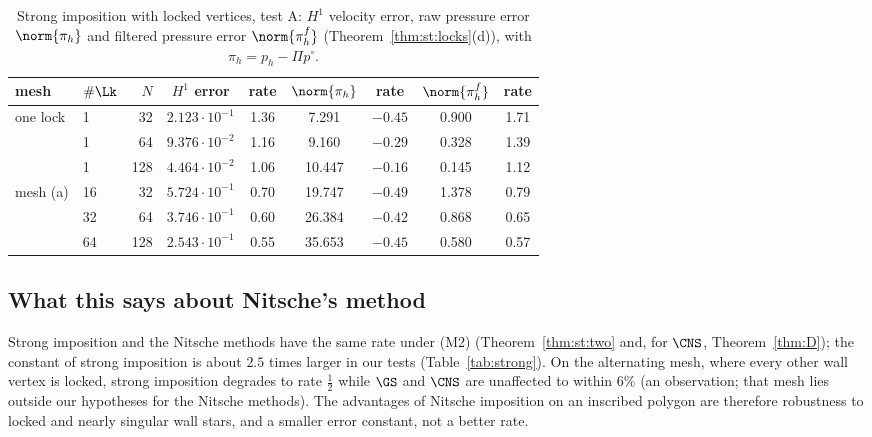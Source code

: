 \begin{table}[t]
\centering\small
\caption{Strong imposition with locked vertices, test A: $H^1$ velocity error, raw pressure error $\norm{\pi_h}$ and filtered pressure error $\norm{\pi_h^f}$ (Theorem~\ref{thm:st:locks}(d)), with $\pi_h=p_h-\Pi p^\circ$.}\label{tab:locks}
\begin{tabular}{llrcccccc}
\toprule
mesh & $\#\Lk$ & $N$ & $H^1$ error & rate & $\norm{\pi_h}$ & rate & $\norm{\pi_h^f}$ & rate\\
\midrule
one lock & 1 & 32 & $2.123\cdot10^{-1}$ & 1.36 & 7.291 & $-0.45$ & 0.900 & 1.71\\
 & 1 & 64 & $9.376\cdot10^{-2}$ & 1.16 & 9.160 & $-0.29$ & 0.328 & 1.39\\
 & 1 & 128 & $4.464\cdot10^{-2}$ & 1.06 & 10.447 & $-0.16$ & 0.145 & 1.12\\
mesh (a) & 16 & 32 & $5.724\cdot10^{-1}$ & 0.70 & 19.747 & $-0.49$ & 1.378 & 0.79\\
 & 32 & 64 & $3.746\cdot10^{-1}$ & 0.60 & 26.384 & $-0.42$ & 0.868 & 0.65\\
 & 64 & 128 & $2.543\cdot10^{-1}$ & 0.55 & 35.653 & $-0.45$ & 0.580 & 0.57\\
\bottomrule
\end{tabular}
\end{table}

\subsection{What this says about Nitsche's method}
Strong imposition and the Nitsche methods have the same rate under (M2) (Theorem~\ref{thm:st:two} and, for $\CNS$, Theorem~\ref{thm:D}); the constant of strong imposition is about $2.5$ times larger in our tests (Table~\ref{tab:strong}). On the alternating mesh, where every other wall vertex is locked, strong imposition degrades to rate $\frac12$ while $\GS$ and $\CNS$ are unaffected to within $6\%$ (an observation; that mesh lies outside our hypotheses for the Nitsche methods). The advantages of Nitsche imposition on an inscribed polygon are therefore robustness to locked and nearly singular wall stars, and a smaller error constant, not a better rate.
